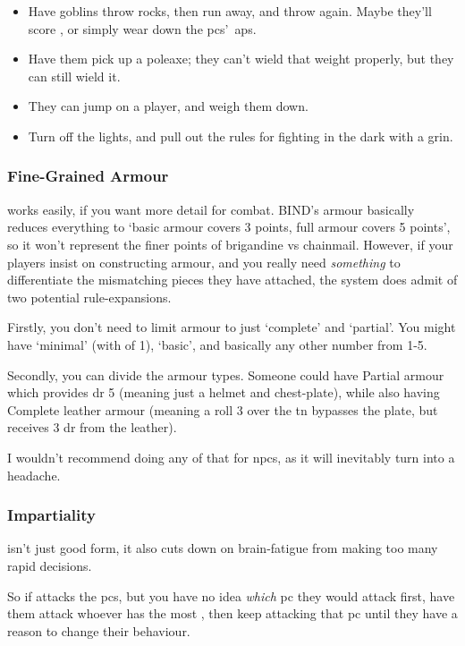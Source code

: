 \begin{multicols}{2}
\begin{itemize}
  \item
  Have goblins throw rocks, then run away, and throw again.
  Maybe they'll score , or simply wear down the \glspl{pc}'~\glspl{ap}.
  \item
  Have them pick up a poleaxe; they can't wield that weight properly, but they can still wield it.
  \item
  They can jump on a player, and weigh them down.
  \item
  Turn off the lights, and pull out the rules for fighting in the dark with a grin.%
\end{itemize}

\subsubsection{Fine-Grained Armour}
works easily, if you want more detail for combat.
BIND's armour basically reduces everything to `basic armour covers 3 points, full armour covers 5 points', so it won't represent the finer points of brigandine vs chainmail.
However, if your players insist on constructing armour, and you really need \emph{something} to differentiate the mismatching pieces they have attached, the system does admit of two potential rule-expansions.

Firstly, you don't need to limit armour to just `complete' and `partial'.
You might have `minimal' (with  of 1), `basic', and basically any other number from 1-5.

Secondly, you can divide the armour types.
Someone could have Partial armour which provides \gls{dr} 5 (meaning just a helmet and chest-plate), while also having Complete leather armour (meaning a roll 3 over the \gls{tn} bypasses the plate, but receives 3 \gls{dr} from the leather).

I wouldn't recommend doing any of that for \glspl{npc}, as it will inevitably turn into a headache.

\subsubsection{Impartiality}
isn't just good form, it also cuts down on brain-fatigue from making too many rapid decisions.

So if  attacks the \glspl{pc}, but you have no idea \textit{which} \gls{pc} they would attack first, have them attack whoever has the most , then keep attacking that \gls{pc} until they have a reason to change their behaviour.


\end{multicols}
